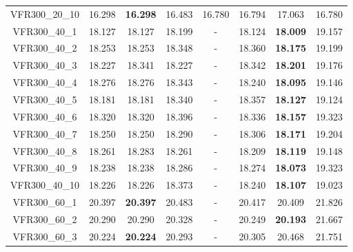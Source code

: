 \begin{tabular}{cc|ccc|ccc}
VFR300\_20\_10     & 16.298           & {\bf 16.298}     & 16.483           & 16.780           & 16.794           & 17.063           & 16.780          \\ 
VFR300\_40\_1      & 18.127           & 18.127           & 18.199           & -                & 18.124           & {\bf 18.009}     & 19.157          \\ 
VFR300\_40\_2      & 18.253           & 18.253           & 18.348           & -                & 18.360           & {\bf 18.175}     & 19.199          \\ 
VFR300\_40\_3      & 18.227           & 18.341           & 18.227           & -                & 18.342           & {\bf 18.201}     & 19.176          \\ 
VFR300\_40\_4      & 18.276           & 18.276           & 18.343           & -                & 18.240           & {\bf 18.095}     & 19.146          \\ 
VFR300\_40\_5      & 18.181           & 18.181           & 18.340           & -                & 18.357           & {\bf 18.127}     & 19.124          \\ 
VFR300\_40\_6      & 18.320           & 18.320           & 18.396           & -                & 18.336           & {\bf 18.157}     & 19.323          \\ 
VFR300\_40\_7      & 18.250           & 18.250           & 18.290           & -                & 18.306           & {\bf 18.171}     & 19.204          \\ 
VFR300\_40\_8      & 18.261           & 18.283           & 18.261           & -                & 18.209           & {\bf 18.119}     & 19.148          \\ 
VFR300\_40\_9      & 18.238           & 18.238           & 18.286           & -                & 18.274           & {\bf 18.073}     & 19.323          \\ 
VFR300\_40\_10     & 18.226           & 18.226           & 18.373           & -                & 18.240           & {\bf 18.107}     & 19.023          \\ 
VFR300\_60\_1      & 20.397           & {\bf 20.397}     & 20.483           & -                & 20.417           & 20.409           & 21.826          \\ 
VFR300\_60\_2      & 20.290           & 20.290           & 20.328           & -                & 20.249           & {\bf 20.193}     & 21.667          \\ 
VFR300\_60\_3      & 20.224           & {\bf 20.224}     & 20.293           & -                & 20.305           & 20.468           & 21.751          \\ 

\end{tabular}
